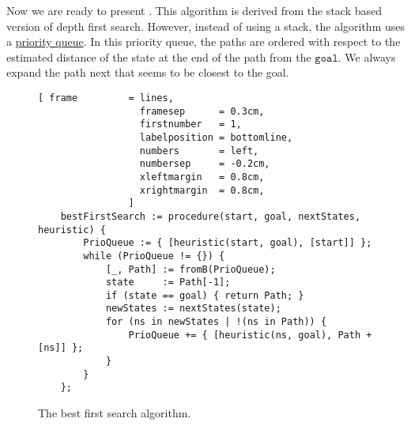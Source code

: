 Now we are ready to present .  This algorithm is derived from the stack based
version of depth first search.  However, instead of using a stack, the algorithm uses a
\href{https://en.wikipedia.org/wiki/Priority_queue}{priority queue}.  In this priority queue, the paths are
ordered with respect to the estimated distance of the state at the end of the path from the $\mathtt{goal}$.
We always expand the path next that seems to be closest to the goal.

\begin{figure}[!ht]
\centering
\begin{Verbatim}[ frame         = lines,
                  framesep      = 0.3cm,
                  firstnumber   = 1,
                  labelposition = bottomline,
                  numbers       = left,
                  numbersep     = -0.2cm,
                  xleftmargin   = 0.8cm,
                  xrightmargin  = 0.8cm,
                ]
    bestFirstSearch := procedure(start, goal, nextStates, heuristic) {
        PrioQueue := { [heuristic(start, goal), [start]] };
        while (PrioQueue != {}) {
            [_, Path] := fromB(PrioQueue);
            state     := Path[-1];
            if (state == goal) { return Path; }
            newStates := nextStates(state);
            for (ns in newStates | !(ns in Path)) {
                PrioQueue += { [heuristic(ns, goal), Path + [ns]] };
            }
        }
    };
\end{Verbatim}
\vspace*{-0.3cm}
\caption{The best first search algorithm.}
\label{fig:best-first-search.stlx}
\end{figure}


